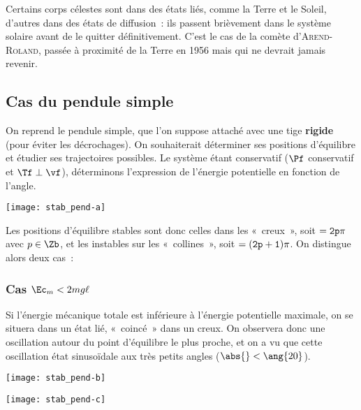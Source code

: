 \documentclass[../main/main.tex]{subfiles}
\begin{document}
Certains corps célestes sont dans des états liés, comme la Terre et le Soleil,
d'autres dans des états de diffusion~: ils passent brièvement dans le système
solaire avant de le quitter définitivement. C'est le cas de la comète
d'\textsc{Arend-Roland}, passée à proximité de la Terre en 1956 mais qui ne
devrait jamais revenir.

\subsection{Cas du pendule simple}
On reprend le pendule simple, que l'on suppose attaché avec une tige
\textbf{rigide} (pour éviter les décrochages). On souhaiterait déterminer ses
positions d'équilibre et étudier ses trajectoires possibles. Le système étant
conservatif ($\Pf$ conservatif et $\Tf\perp\vf$), déterminons l'expression de
l'énergie potentielle en fonction de l'angle.

\smallbreak\noindent
{}
\begin{center}
    \texttt{[image: stab\_pend-a]}
\end{center}
Les positions d'équilibre stables sont donc celles dans les «~creux~», soit $\tt =
2p\pi$ avec $p\in\Zb$, et les instables sur les «~collines~», soit $\tt =
(2p+1)\pi$. On distingue alors deux cas~:

\subsubsection{Cas $\Ec_m < 2mg\ell$}
Si l'énergie mécanique totale est inférieure à l'énergie potentielle maximale, on se
situera dans un état lié, «~coincé~» dans un creux. On observera donc une
oscillation autour du point d'équilibre le plus proche, et on a vu que cette
oscillation état sinusoïdale aux très petits angles ($\abs{\tt} < \ang{20}$).

\begin{minipage}{0.45\linewidth}
    \begin{center}
        \texttt{[image: stab\_pend-b]}
    \end{center}
\end{minipage}
\hfill
\begin{minipage}{0.45\linewidth}
    \begin{center}
        \texttt{[image: stab\_pend-c]}
    \end{center}
\end{minipage}
\end{document}
